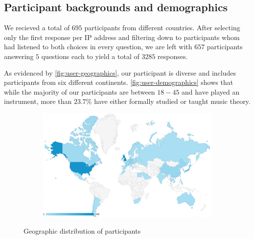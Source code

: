 \subsection{Participant backgrounds and demographics}

We recieved a total of $695$ participants from 
different countries. After selecting only the first response per IP address and
filtering down to participants whom had listened to both choices in every
question, we are left with $657$ participants answering
$5$ questions each to yield a total of $3285$ responses.

As evidenced by \vref{fig:user-geographics}, our participant is diverse and
includes participants from six different continents.
\vref{fig:user-demographics} shows that while the majority of our participants
are between $18-45$ and have played an instrument, more than
$23.7\%$ have either formally studied or taught music theory.

\begin{figure}[p]
  \centering
  \begin{subfigure}[b]{0.98\textwidth}
    \centering
    \includegraphics[width=0.85\linewidth]{participants-by-country.png}
  \end{subfigure}
  \begin{subfigure}[c]{0.55\textwidth}
    \centering
    
  \end{subfigure}
  \begin{subfigure}[c]{0.44\textwidth}
    \centering
    
  \end{subfigure}
  \caption{Geographic distribution of participants}
  \label{fig:user-geographics}
\end{figure}

